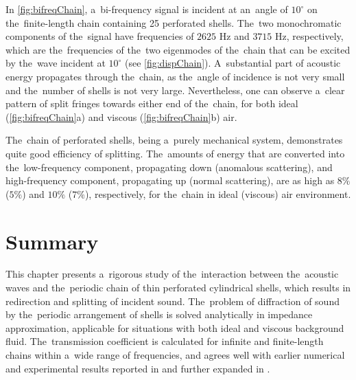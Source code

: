 In \cref{fig:bifreqChain}, a~bi-frequency signal is incident at an~angle of $10^{\circ}$ on the~finite-length chain containing 25 perforated shells.
The~two monochromatic components of the~signal have frequencies of $2625$ Hz and $3715$ Hz, respectively, which are the~frequencies of the~two eigenmodes of the~chain that can be excited by the~wave incident at $10^{\circ}$ (see \cref{fig:dispChain}).
A~substantial part of acoustic energy propagates through the~chain, as the~angle of incidence is not very small and the~number of shells is not very large.
Nevertheless, one can observe a~clear pattern of split fringes towards either end of the~chain, for both ideal (\cref{fig:bifreqChain}a) and viscous (\cref{fig:bifreqChain}b) air.

The~chain of perforated shells, being a~purely mechanical system, demonstrates quite good efficiency of splitting.
The~amounts of energy that are converted into the~low-frequency component, propagating down (anomalous scattering), and high-frequency component, propagating up (normal scattering), are as high as $8\%$ ($5\%$) and $10\%$ ($7\%$), respectively, for the~chain in ideal (viscous) air environment.



\section{Summary}

This chapter presents a~rigorous study of the~interaction between the~acoustic waves and the~periodic chain of thin perforated cylindrical shells, which results in redirection and splitting of incident sound.
The~problem of diffraction of sound by the~periodic arrangement of shells is solved analytically in impedance approximation, applicable for situations with both ideal and viscous background fluid.
The~transmission coefficient is calculated for infinite and finite-length chains within a~wide range of frequencies, and agrees well with earlier numerical and experimental results reported in \cite{garcia1} and further expanded in \cite{victorthesis}.

